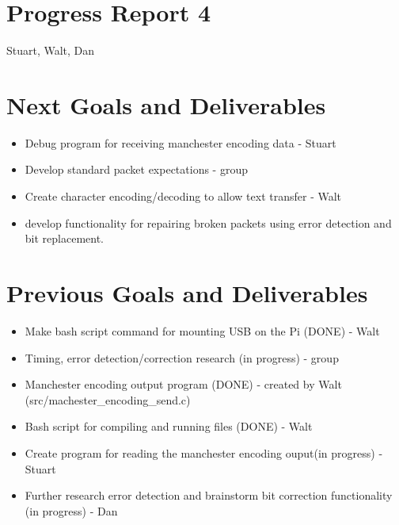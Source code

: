 \documentclass{article}
\begin{document}
\section*{Progress Report 4}
Stuart, Walt, Dan

\section*{Next Goals and Deliverables}
\begin{itemize}
\item Debug program for receiving manchester encoding data - Stuart
\item Develop standard packet expectations - group
\item Create character encoding/decoding to allow text transfer - Walt
\item develop functionality for repairing broken packets using error detection and bit replacement.
\end{itemize}

\section*{Previous Goals and Deliverables}
\begin{itemize}
    \item Make bash script command for mounting USB on the Pi (DONE) - Walt
    \item Timing, error detection/correction research (in progress) - group
    \item Manchester encoding output program (DONE) - created by Walt (src/machester\_encoding\_send.c)
    \item Bash script for compiling and running files (DONE) - Walt
    \item Create program for reading the manchester encoding ouput(in progress) - Stuart
    \item Further research error detection and brainstorm bit correction functionality (in progress) - Dan
\end{itemize}

\end{document}

